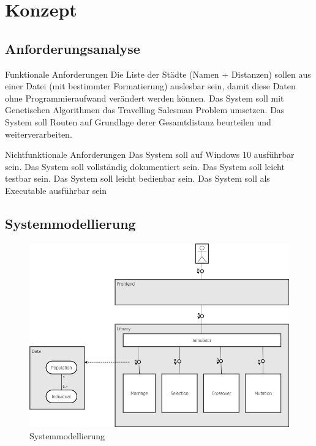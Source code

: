 
\section{Konzept}

\subsection{Anforderungsanalyse}
Funktionale Anforderungen
Die Liste der Städte (Namen + Distanzen) sollen aus einer Datei (mit bestimmter Formatierung) auslesbar sein, damit diese Daten ohne Programmieraufwand verändert werden können.
Das System soll mit Genetischen Algorithmen das Travelling Salesman Problem umsetzen.
Das System soll Routen auf Grundlage derer Gesamtdistanz beurteilen und weiterverarbeiten.

Nichtfunktionale Anforderungen
Das System soll auf Windows 10 ausführbar sein.
Das System soll vollständig dokumentiert sein.
Das System soll leicht testbar sein.
Das System soll leicht bedienbar sein.
Das System soll als Executable ausführbar sein


\subsection{Systemmodellierung}

\begin{figure}[H]
\centering
\includegraphics[width=1\textwidth]{img/Vortrag/Systemmodellierung.png}
\caption{Systemmodellierung}
\label{fig:systemmodellierung}
\end{figure}

